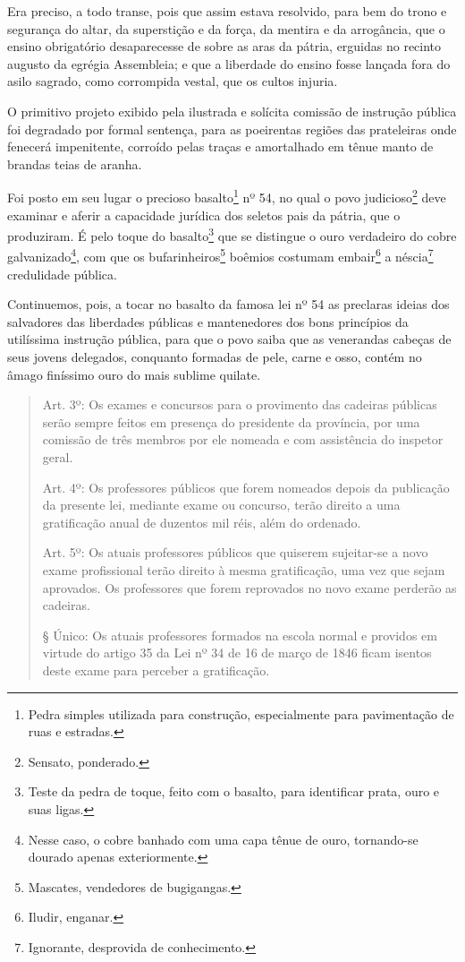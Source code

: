 Era preciso, a todo transe, pois que assim estava resolvido, para bem do
trono e segurança do altar, da superstição e da força, da mentira e da
arrogância, que o ensino obrigatório desaparecesse de sobre as aras da
pátria, erguidas no recinto augusto da egrégia Assembleia; e que a
liberdade do ensino fosse lançada fora do asilo sagrado, como corrompida
vestal, que os cultos injuria.

O primitivo projeto exibido pela ilustrada e solícita comissão de
instrução pública foi degradado por formal sentença, para as poeirentas
regiões das prateleiras onde fenecerá impenitente, corroído pelas traças
e amortalhado em tênue manto de brandas teias de aranha.

Foi posto em seu lugar o precioso basalto\footnote{Pedra simples
  utilizada para construção, especialmente para pavimentação de ruas e
  estradas.} nº 54, no qual o povo judicioso\footnote{Sensato,
  ponderado.} deve examinar e aferir a capacidade jurídica dos seletos
pais da pátria, que o produziram. É pelo toque do basalto\footnote{
  Teste da pedra de toque, feito com o basalto, para identificar prata,
  ouro e suas ligas.} que se distingue o ouro verdadeiro do cobre
galvanizado\footnote{Nesse caso, o cobre banhado com uma capa tênue de
  ouro, tornando-se dourado apenas exteriormente.}, com que os
bufarinheiros\footnote{Mascates, vendedores de bugigangas.} boêmios
costumam embair\footnote{Iludir, enganar.} a néscia\footnote{
  Ignorante, desprovida de conhecimento.} credulidade pública.

Continuemos, pois, a tocar no basalto da famosa lei nº 54 as preclaras
ideias dos salvadores das liberdades públicas e mantenedores dos bons
princípios da utilíssima instrução pública, para que o povo saiba que as
venerandas cabeças de seus jovens delegados, conquanto formadas de pele,
carne e osso, contém no âmago finíssimo ouro do mais sublime quilate.

\begin{quote}
Art. 3º: Os exames e concursos para o provimento das cadeiras públicas
serão sempre feitos em presença do presidente da província, por uma
comissão de três membros por ele nomeada e com assistência do inspetor
geral.

Art. 4º: Os professores públicos que forem nomeados depois da publicação
da presente lei, mediante exame ou concurso, terão direito a uma
gratificação anual de duzentos mil réis, além do ordenado.

Art. 5º: Os atuais professores públicos que quiserem sujeitar-se a novo
exame profissional terão direito à mesma gratificação, uma vez que sejam
aprovados. Os professores que forem reprovados no novo exame perderão as
cadeiras.

§ Único: Os atuais professores formados na escola normal e providos em
virtude do artigo 35 da Lei nº 34 de 16 de março de 1846 ficam isentos
deste exame para perceber a gratificação.
\end{quote}

